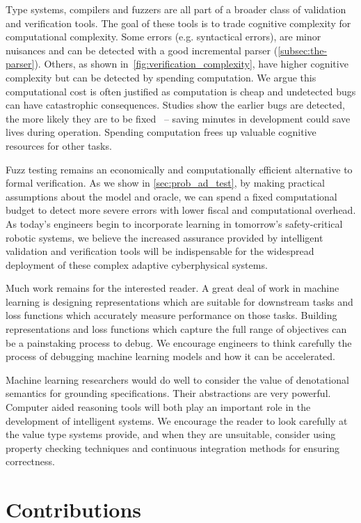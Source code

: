 Type systems, compilers and fuzzers are all part of a broader class of validation and verification tools. The goal of these tools is to trade cognitive complexity for computational complexity. Some errors (e.g. syntactical errors), are minor nuisances and can be detected with a good incremental parser (\autoref{subsec:the-parser}). Others, as shown in~\autoref{fig:verification_complexity}, have higher cognitive complexity but can be detected by spending computation. We argue this computational cost is often justified as computation is cheap and undetected bugs can have catastrophic consequences. Studies show the earlier bugs are detected, the more likely they are to be fixed~\citep{distefano2019scaling} -- saving minutes in development could save lives during operation. Spending computation frees up valuable cognitive resources for other tasks.

Fuzz testing remains an economically and computationally efficient alternative to formal verification. As we show in \autoref{sec:prob_ad_test}, by making practical assumptions about the model and oracle, we can spend a fixed computational budget to detect more severe errors with lower fiscal and computational overhead. As today's engineers begin to incorporate learning in tomorrow's safety-critical robotic systems, we believe the increased assurance provided by intelligent validation and verification tools will be indispensable for the widespread deployment of these complex adaptive cyberphysical systems.

Much work remains for the interested reader. A great deal of work in machine learning is designing representations which are suitable for downstream tasks and loss functions which accurately measure performance on those tasks. Building representations and loss functions which capture the full range of objectives can be a painstaking process to debug. We encourage engineers to think carefully the process of debugging machine learning models and how it can be accelerated.

Machine learning researchers would do well to consider the value of denotational semantics for grounding specifications. Their abstractions are very powerful. Computer aided reasoning tools will both play an important role in the development of intelligent systems. We encourage the reader to look carefully at the value type systems provide, and when they are unsuitable, consider using property checking techniques and continuous integration methods for ensuring correctness.

\section{Contributions}

